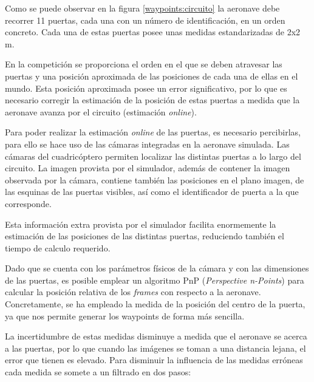 Como se puede observar en la figura \ref{waypoints:circuito} la aeronave debe recorrer 11 puertas, cada una con un número de identificación, en un orden concreto. Cada una de estas puertas posee unas medidas estandarizadas de 2x2 m.

En la competición se proporciona el orden en el que se deben atravesar las puertas y una posición aproximada de las posiciones de cada una de ellas en el mundo. Esta posición aproximada posee un error significativo, por lo que es necesario corregir la estimación de la posición de estas puertas a medida que la aeronave avanza por el circuito (estimación \textit{online}).

Para poder realizar la estimación \textit{online} de las puertas, es necesario percibirlas, para ello se hace uso de las cámaras integradas en la aeronave simulada. Las cámaras del cuadricóptero permiten localizar las distintas puertas a lo largo del circuito. La imagen provista por el simulador, además de contener la imagen observada por la cámara, contiene también las posiciones en el plano imagen, de las esquinas de las puertas visibles, así como el identificador de puerta a la que corresponde.


Esta información extra provista por el simulador facilita enormemente la estimación de las posiciones de las distintas puertas, reduciendo también el tiempo de calculo requerido.



Dado que se cuenta con los parámetros físicos de la cámara y con las dimensiones de las puertas, es posible emplear un algoritmo PnP (\textit{Perspective n-Points}) para calcular la posición relativa de los \textit{frames} con respecto a la aeronave. Concretamente, se ha empleado la medida de la posición del centro de la puerta, ya que nos permite generar los waypoints de forma más sencilla.






La incertidumbre de estas medidas disminuye a medida que el aeronave se acerca a las puertas, por lo que cuando las imágenes se toman a una distancia lejana, el error que tienen es elevado. Para disminuir la influencia de las medidas erróneas cada medida se somete a un filtrado en dos pasos:

